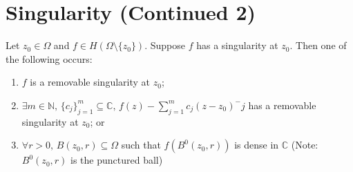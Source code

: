 \documentclass[notoc,notitlepage]{tufte-book}
\begin{document}
\section{Singularity (Continued 2)} %
\label{sec:singularity_continued_2}

\begin{thm}\label{thm:casorati_weierstrass}
	Let $z_0 \in \Omega$ and $f \in H(\Omega \setminus \{z_0\})$. Suppose $f$ has a singularity at $z_0$. Then one of the following occurs:
	\begin{enumerate}
		\item $f$ is a removable singularity at $z_0$;
		\item $\exists m \in \mathbb{N}, \, \{c_j\}_{j = 1}^m \subseteq \mathbb{C}, \, f(z) - \sum_{j=1}^{m} c_j (z - z_0)^-j$ has a removable singularity at $z_0$; or
		\item $\forall r > 0, \, B(z_0, r) \subseteq \Omega$ such that $f(B^0(z_0, r))$ is dense in $\mathbb{C}$ (Note: $B^0(z_0, r)$ is the punctured ball)
	\end{enumerate}
\end{thm}
\end{document}
